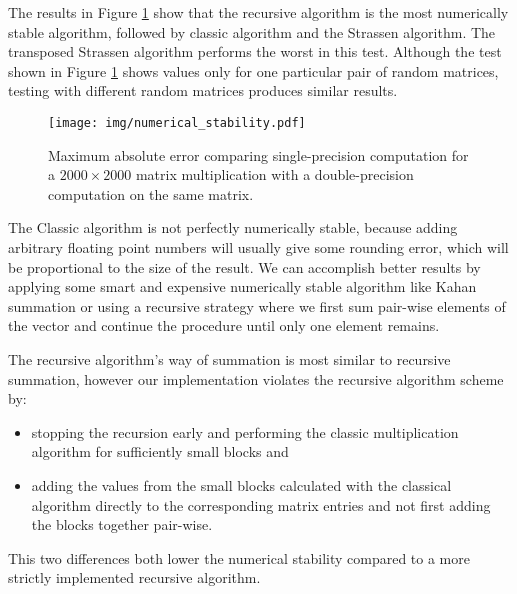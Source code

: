 \documentclass[a4paper,11pt]{article}
\begin{document}
The results in Figure \ref{fig:num_stab} show that the recursive algorithm is the most numerically stable algorithm, followed by classic algorithm and the Strassen algorithm. The transposed Strassen algorithm performs the worst in this test. Although the test shown in Figure \ref{fig:num_stab} shows values only for one particular pair of random matrices, testing with different random matrices produces similar results.

\begin{figure}[h]
\centering
\texttt{[image: img/numerical\_stability.pdf]}
\caption{Maximum absolute error comparing single-precision computation for a $2000 \times 2000$ matrix multiplication with a double-precision computation on the same matrix. }
\label{fig:num_stab}
\end{figure}

The Classic algorithm is not perfectly numerically stable, because 
adding arbitrary floating point numbers will usually give some rounding error, which will be proportional to the size of the result. 
We can accomplish better results by applying some smart and expensive numerically stable algorithm like Kahan summation 
\cite{Kahan}
or using a recursive strategy where we first sum pair-wise elements of the vector and continue the procedure until only one element remains.

The recursive algorithm's way of summation is most similar to recursive summation, however our implementation violates the recursive algorithm scheme by:
\begin{itemize}
\item 
stopping the recursion early and performing the classic multiplication algorithm for sufficiently small blocks and
\item 
adding the values from the small blocks calculated with the classical algorithm directly to the corresponding matrix entries and not first adding the blocks together pair-wise.  
\end{itemize}
This two differences both lower the numerical stability compared to a more strictly implemented recursive algorithm.
\end{document}
